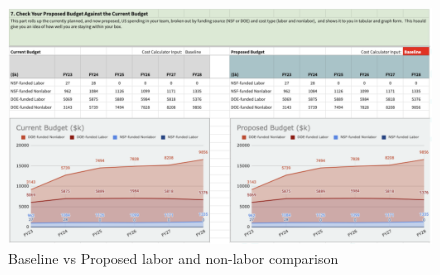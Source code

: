 \begin{figure}[hb!]
\begin{centering}
\includegraphics[width=1.0\textwidth]{Figure5BaselinevsProposed}
	\caption{Baseline vs Proposed labor and non-labor comparison
\label{fig:baseline}}
\end{centering}
\end{figure}
